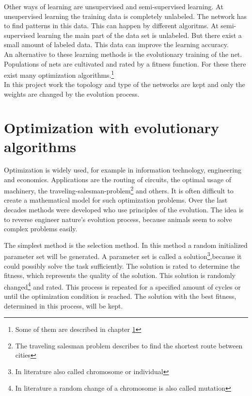 \documentclass[10pt,a4paper,DIV=11]{scrreprt}
\begin{document}
Other ways of learning are unsupervised and semi-supervised learning. At unsupervised learning the training data is completely unlabeled. The network has to find patterns in this data. This can happen by different algoritms. At semi-supervised learning the main part of the data set is unlabeled. But there exist a small amount of labeled data. This data can improve the learning accuracy. \\

An alternative to these learning methods is the evolutionary training of the net. Populations of nets are cultivated and rated by a fitness function. For these there exist many optimization algorithms.\footnote{Some of them are described in chapter \ref{sec:evo}} \\

In this project work the topology and type of the networks are kept and only the weights are changed by the evolution process.




\chapter{Optimization with evolutionary algorithms}
\label{sec:evo}
Optimization is widely used, for example in information technology, engineering and
economics. Applications are the routing of circuits, the optimal usage of machinery,
the traveling-salesman-problem\footnote{The traveling salesman problem describes to find the shortest route between cities} and others. It is often difficult to create a mathematical
model for such optimization problems. Over the last decades methods were developed who use principles of the evolution. The idea is to reverse engineer nature's evolution process, because animals seem to solve complex problems easily.

The simplest method is the selection method. In this method a random initialized parameter set will be generated. A parameter set is called a solution\footnote{In literature also called chromosome or individual},because it could possibly solve the task sufficiently.
The solution is rated to determine the fitness, which represents the quality of the solution.
This solution is randomly changed\footnote{In literature a random change of a chromosome is also called mutation} and rated. This process is repeated for a specified amount of cycles or until the optimization condition is reached. The solution with the best fitness, determined in this process, will be kept.
\end{document}
